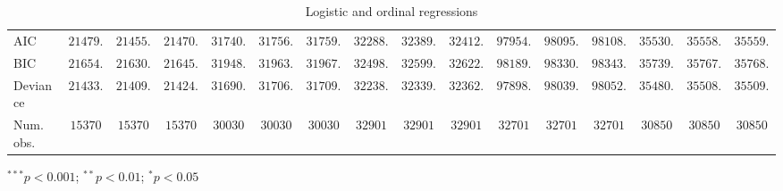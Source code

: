 \begin{table}
\begin{center}
\begin{threeparttable}
\begin{tabular}{l c c c c c c c c c c c c c c c}
AIC                             & $21479.05$   & $21455.01$   & $21470.20$   & $31740.54$    & $31756.02$    & $31759.91$    & $32288.81$    & $32389.53$    & $32412.79$    & $97954.46$    & $98095.65$    & $98108.68$    & $35530.62$    & $35558.60$    & $35559.92$    \\
BIC                             & $21654.77$   & $21630.73$   & $21645.93$   & $31948.29$    & $31963.77$    & $31967.65$    & $32498.84$    & $32599.57$    & $32622.83$    & $98189.53$    & $98330.71$    & $98343.75$    & $35739.04$    & $35767.02$    & $35768.34$    \\
Deviance                        & $21433.05$   & $21409.01$   & $21424.20$   & $31690.54$    & $31706.02$    & $31709.91$    & $32238.81$    & $32339.53$    & $32362.79$    & $97898.46$    & $98039.65$    & $98052.68$    & $35480.62$    & $35508.60$    & $35509.92$    \\
Num. obs.                       & $15370$      & $15370$      & $15370$      & $30030$       & $30030$       & $30030$       & $32901$       & $32901$       & $32901$       & $32701$       & $32701$       & $32701$       & $30850$       & $30850$       & $30850$       \\
\bottomrule
\end{tabular}
\begin{tablenotes}[flushleft]
\scriptsize{\item $^{***}p<0.001$; $^{**}p<0.01$; $^{*}p<0.05$}
\end{tablenotes}
\end{threeparttable}
\caption{Logistic and ordinal regressions}
\label{table:coefficients}
\end{center}
\end{table}
